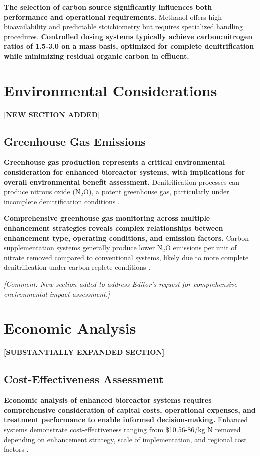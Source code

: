\documentclass[12pt,a4paper]{article}
\newcommand{\added}[1]{\textcolor{addedtext}{\textbf{#1}}}
\newcommand{\comment}[1]{\textcolor{commenttext}{\textit{[Comment: #1]}}}
\begin{document}
\added{The selection of carbon source significantly influences both performance and operational requirements.} Methanol offers high bioavailability and predictable stoichiometry but requires specialized handling procedures. \added{Controlled dosing systems typically achieve carbon:nitrogen ratios of 1.5-3.0 on a mass basis, optimized for complete denitrification while minimizing residual organic carbon in effluent.}

\section{Environmental Considerations}

\textcolor{addedtext}{\textbf{[NEW SECTION ADDED]}}
\subsection{Greenhouse Gas Emissions}

\added{Greenhouse gas production represents a critical environmental consideration for enhanced bioreactor systems, with implications for overall environmental benefit assessment.} Denitrification processes can produce nitrous oxide (N$_2$O), a potent greenhouse gas, particularly under incomplete denitrification conditions \citep{RN611, RN708}.

\added{Comprehensive greenhouse gas monitoring across multiple enhancement strategies reveals complex relationships between enhancement type, operating conditions, and emission factors.} Carbon supplementation systems generally produce lower N$_2$O emissions per unit of nitrate removed compared to conventional systems, likely due to more complete denitrification under carbon-replete conditions \citep{RN708}.

\comment{New section added to address Editor's request for comprehensive environmental impact assessment.}

\section{Economic Analysis}

\textcolor{addedtext}{\textbf{[SUBSTANTIALLY EXPANDED SECTION]}}
\subsection{Cost-Effectiveness Assessment}

\added{Economic analysis of enhanced bioreactor systems requires comprehensive consideration of capital costs, operational expenses, and treatment performance to enable informed decision-making.} Enhanced systems demonstrate cost-effectiveness ranging from \$10.56-86/kg N removed depending on enhancement strategy, scale of implementation, and regional cost factors \citep{RN632, RN350, RN624}.
\end{document}
